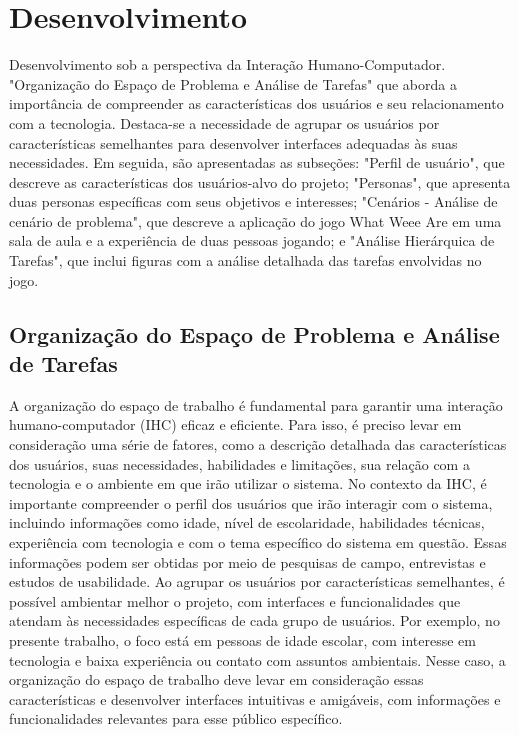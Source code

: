 \chapter{Desenvolvimento}
\label{desenvolvimento}
Desenvolvimento sob a perspectiva da Interação Humano-Computador. "Organização do Espaço de Problema e Análise de Tarefas" que aborda a importância de compreender as características dos usuários e seu relacionamento com a tecnologia. Destaca-se a necessidade de agrupar os usuários por características semelhantes para desenvolver interfaces adequadas às suas necessidades. Em seguida, são apresentadas as subseções: "Perfil de usuário", que descreve as características dos usuários-alvo do projeto; "Personas", que apresenta duas personas específicas com seus objetivos e interesses; "Cenários - Análise de cenário de problema", que descreve a aplicação do jogo What Weee Are em uma sala de aula e a experiência de duas pessoas jogando; e "Análise Hierárquica de Tarefas", que inclui figuras com a análise detalhada das tarefas envolvidas no jogo.

\section{Organização do Espaço de Problema e Análise de Tarefas}
A organização do espaço de trabalho é fundamental para garantir uma interação humano-computador (IHC) eficaz e eficiente. Para isso, é preciso levar em consideração uma série de fatores, como a descrição detalhada das características dos usuários, suas necessidades, habilidades e limitações, sua relação com a tecnologia e o ambiente em que irão utilizar o sistema. No contexto da IHC, é importante compreender o perfil dos usuários que irão interagir com o sistema, incluindo informações como idade, nível de escolaridade, habilidades técnicas, experiência com tecnologia e com o tema específico do sistema em questão. Essas informações podem ser obtidas por meio de pesquisas de campo, entrevistas e estudos de usabilidade. Ao agrupar os usuários por características semelhantes, é possível ambientar melhor o projeto, com interfaces e funcionalidades que atendam às necessidades específicas de cada grupo de usuários. Por exemplo, no presente trabalho, o foco está em pessoas de idade escolar, com interesse em tecnologia e baixa experiência ou contato com assuntos ambientais. Nesse caso, a organização do espaço de trabalho deve levar em consideração essas características e desenvolver interfaces intuitivas e amigáveis, com informações e funcionalidades relevantes para esse público específico.

